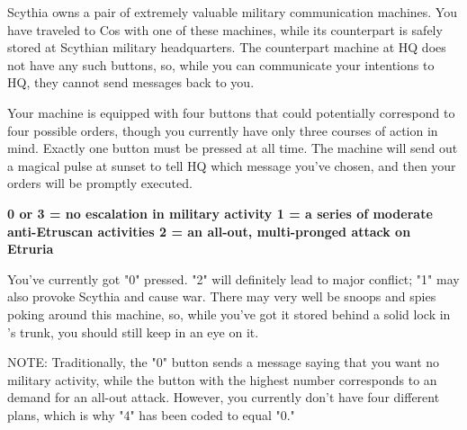 \documentclass[green]{Kos}
\begin{document}
\name{\gScythiaMachine{}}

Scythia owns a pair of extremely valuable military communication machines. You have traveled to Cos with one of these machines, while its counterpart is safely stored at Scythian military headquarters. The counterpart machine at HQ does not have any such buttons, so, while you can communicate your intentions to HQ, they cannot send messages back to you. 

Your machine is equipped with four buttons that could potentially correspond to four possible orders, though you currently have only three courses of action in mind. Exactly one button must be pressed at all time. The machine will send out a magical pulse at sunset to tell HQ which message you've chosen, and then your orders will be promptly executed.

\bf{0 or 3} = no escalation in military activity
\bf{1} = a series of moderate anti-Etruscan activities
\bf{2} = an all-out, multi-pronged attack on Etruria

You've currently got "0" pressed. "2" will definitely lead to major conflict; "1" may also provoke Scythia and cause war. There may very well be snoops and spies poking around this machine, so, while you've got it stored behind a solid lock in \cScythiaQueen{}'s trunk, you should still keep in an eye on it.

NOTE: Traditionally, the "0" button sends a message saying that you want no military activity, while the button with the highest number corresponds to an demand for an all-out attack. However, you currently don't have four different plans, which is why "4" has been coded to equal "0."
\end{document}
